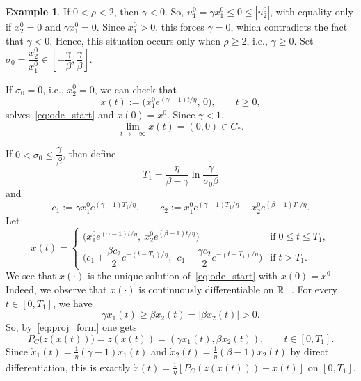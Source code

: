 \documentclass[11pt]{article}
\theoremstyle{definition}
\newtheorem{example}{Example}
\theoremstyle{remark}
\def\R{\Bbb R}
\begin{document}
\begin{example}
{			If $0<\rho<2$, then $\gamma<0$. So, $u_1^0=\gamma x_1^0\leq 0\leq |u_2^0|$, with equality only if $x_2^0=0$ and $\gamma x_1^0=0$. Since $x_1^0>0$, this forces $\gamma=0$, which contradicts the fact that $\gamma<0$. Hence, this situation occurs only when $\rho\ge2$, i.e., $\gamma\geq 0$. 	Set $\sigma_0=\dfrac{x^0_2}{x^0_1}\in\left[-\dfrac{\gamma}{\beta},\dfrac{\gamma}{\beta}\right]$.
			
			\smallskip
			If $\sigma_0=0$, i.e., $x_2^0=0$, we can check that
			$$
			x(t):=\big(x_1^0e^{(\gamma-1)t/\eta},\,0\big),\qquad t\ge0,
			$$
			solves~\eqref{eq:ode_start} and $x(0)=x^0$. Since $\gamma<1$,
			$$
			\lim_{t\to+\infty}x(t)=(0,0)\in  C_*.
			$$
			
			\smallskip
			If  $0<\sigma_0\leq\dfrac{\gamma}{\beta}$, then define
			$$
			T_1=\frac\eta{\beta-\gamma}\ln\dfrac{\gamma}{\sigma_0\beta}
			$$
			and
			$$
			c_1:=\gamma x_1^0e^{(\gamma-1)T_1/\eta},\qquad c_2:=x_1^0e^{(\gamma-1)T_1/\eta}-x_2^0e^{(\beta-1)T_1/\eta}.
			$$
			Let
			\begin{equation}\label{eq:ex_sol2}
				x(t) = 
				\begin{cases}
					\Big(x_1^0e^{(\gamma-1)t/\eta},\ x_2^0e^{(\beta-1)t/\eta}\Big) \quad &\text{if}\;0\leq t\leq T_1,\\[2mm]
					\Big(c_1+\dfrac{\beta c_2}2e^{-(t-T_1)/\eta},\ \ c_1-\dfrac{\gamma c_2}2e^{-(t-T_1)/\eta}\Big) & \text{if}\;t > T_1.
				\end{cases}
			\end{equation}
			We see that $x(\cdot)$ is the unique solution of~\eqref{eq:ode_start} with $x(0)=x^0$. Indeed, we observe that $x(\cdot)$ is continuously differentiable on $\R_+$. For every $t\in[0,T_1]$, we have $$\gamma x_1(t)\geq\beta x_2(t)=|\beta x_2(t)|>0.$$ So, by~\eqref{eq:proj_form} one gets
			$$
			P_C\big(z(x(t))\big)=z(x(t))=(\gamma x_1(t),\beta x_2(t)),\qquad t\in[0,T_1].
			$$
			Since $\dot x_1(t)=\tfrac1\eta(\gamma-1)x_1(t)$ and $\dot x_2(t)=\tfrac1\eta(\beta-1)x_2(t)$ by direct differentiation, this is exactly $\dot x(t)=\tfrac1\eta[P_C(z(x(t)))-x(t)]$ on $[0,T_1]$. 
			
}
\end{example}
\end{document}
